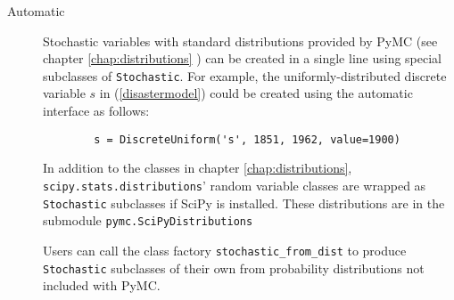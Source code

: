 \begin{description}    
    \item[Automatic] Stochastic variables with standard distributions provided by PyMC (see chapter \ref{chap:distributions} ) can be created in a single line using special subclasses of \texttt{Stochastic}. For example, the uniformly-distributed discrete variable $s$ in (\ref{disastermodel}) could be created using the automatic interface as follows:
    \begin{verbatim}
        s = DiscreteUniform('s', 1851, 1962, value=1900)
    \end{verbatim}

    In addition to the classes in chapter \ref{chap:distributions}, \texttt{scipy.stats.distributions}' random variable classes are wrapped as \texttt{Stochastic} subclasses if SciPy is installed. These distributions are in the submodule \texttt{pymc.SciPyDistributions}

    Users can call the class factory \texttt{stochastic_from_dist} to produce \texttt{Stochastic} subclasses of their own from probability distributions not included with PyMC.%
    

\end{description}
